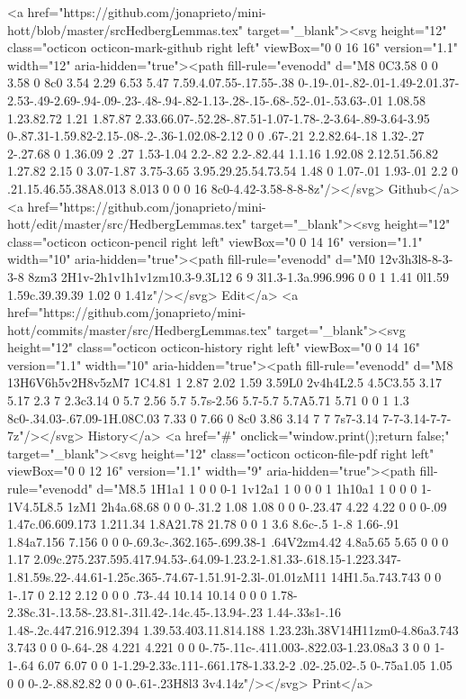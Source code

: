       <a href="https://github.com/jonaprieto/mini-hott/blob/master/srcHedbergLemmas.tex" target="_blank"><svg height="12" class="octicon octicon-mark-github right left" viewBox="0 0 16 16" version="1.1" width="12" aria-hidden="true"><path fill-rule="evenodd" d="M8 0C3.58 0 0 3.58 0 8c0 3.54 2.29 6.53 5.47 7.59.4.07.55-.17.55-.38 0-.19-.01-.82-.01-1.49-2.01.37-2.53-.49-2.69-.94-.09-.23-.48-.94-.82-1.13-.28-.15-.68-.52-.01-.53.63-.01 1.08.58 1.23.82.72 1.21 1.87.87 2.33.66.07-.52.28-.87.51-1.07-1.78-.2-3.64-.89-3.64-3.95 0-.87.31-1.59.82-2.15-.08-.2-.36-1.02.08-2.12 0 0 .67-.21 2.2.82.64-.18 1.32-.27 2-.27.68 0 1.36.09 2 .27 1.53-1.04 2.2-.82 2.2-.82.44 1.1.16 1.92.08 2.12.51.56.82 1.27.82 2.15 0 3.07-1.87 3.75-3.65 3.95.29.25.54.73.54 1.48 0 1.07-.01 1.93-.01 2.2 0 .21.15.46.55.38A8.013 8.013 0 0 0 16 8c0-4.42-3.58-8-8-8z"/></svg> Github</a>
      <a href="https://github.com/jonaprieto/mini-hott/edit/master/src/HedbergLemmas.tex" target="_blank"><svg height="12" class="octicon octicon-pencil right left" viewBox="0 0 14 16" version="1.1" width="10" aria-hidden="true"><path fill-rule="evenodd" d="M0 12v3h3l8-8-3-3-8 8zm3 2H1v-2h1v1h1v1zm10.3-9.3L12 6 9 3l1.3-1.3a.996.996 0 0 1 1.41 0l1.59 1.59c.39.39.39 1.02 0 1.41z"/></svg> Edit</a>
      <a href="https://github.com/jonaprieto/mini-hott/commits/master/src/HedbergLemmas.tex" target="_blank"><svg height="12" class="octicon octicon-history right left" viewBox="0 0 14 16" version="1.1" width="10" aria-hidden="true"><path fill-rule="evenodd" d="M8 13H6V6h5v2H8v5zM7 1C4.81 1 2.87 2.02 1.59 3.59L0 2v4h4L2.5 4.5C3.55 3.17 5.17 2.3 7 2.3c3.14 0 5.7 2.56 5.7 5.7s-2.56 5.7-5.7 5.7A5.71 5.71 0 0 1 1.3 8c0-.34.03-.67.09-1H.08C.03 7.33 0 7.66 0 8c0 3.86 3.14 7 7 7s7-3.14 7-7-3.14-7-7-7z"/></svg> History</a>
      <a  href="#" onclick="window.print();return false;" target="_blank"><svg height="12" class="octicon octicon-file-pdf right left" viewBox="0 0 12 16" version="1.1" width="9" aria-hidden="true"><path fill-rule="evenodd" d="M8.5 1H1a1 1 0 0 0-1 1v12a1 1 0 0 0 1 1h10a1 1 0 0 0 1-1V4.5L8.5 1zM1 2h4a.68.68 0 0 0-.31.2 1.08 1.08 0 0 0-.23.47 4.22 4.22 0 0 0-.09 1.47c.06.609.173 1.211.34 1.8A21.78 21.78 0 0 1 3.6 8.6c-.5 1-.8 1.66-.91 1.84a7.156 7.156 0 0 0-.69.3c-.362.165-.699.38-1 .64V2zm4.42 4.8a5.65 5.65 0 0 0 1.17 2.09c.275.237.595.417.94.53-.64.09-1.23.2-1.81.33-.618.15-1.223.347-1.81.59s.22-.44.61-1.25c.365-.74.67-1.51.91-2.3l-.01.01zM11 14H1.5a.743.743 0 0 1-.17 0 2.12 2.12 0 0 0 .73-.44 10.14 10.14 0 0 0 1.78-2.38c.31-.13.58-.23.81-.31l.42-.14c.45-.13.94-.23 1.44-.33s1-.16 1.48-.2c.447.216.912.394 1.39.53.403.11.814.188 1.23.23h.38V14H11zm0-4.86a3.743 3.743 0 0 0-.64-.28 4.221 4.221 0 0 0-.75-.11c-.411.003-.822.03-1.23.08a3 3 0 0 1-1-.64 6.07 6.07 0 0 1-1.29-2.33c.111-.661.178-1.33.2-2 .02-.25.02-.5 0-.75a1.05 1.05 0 0 0-.2-.88.82.82 0 0 0-.61-.23H8l3 3v4.14z"/></svg> Print</a>
